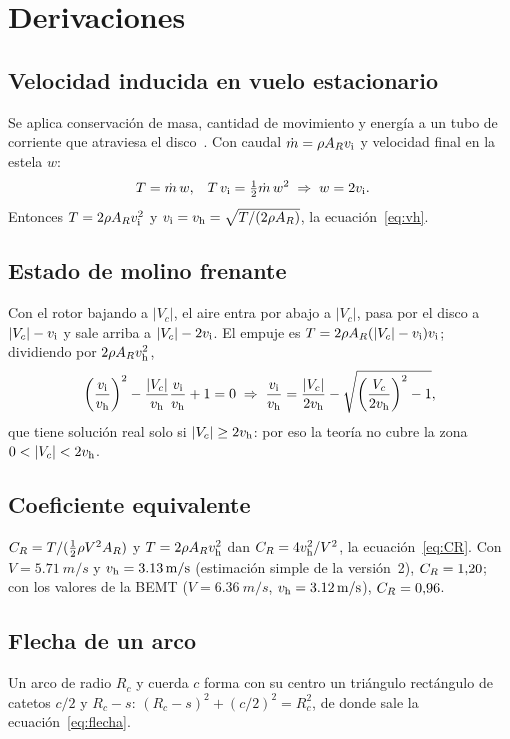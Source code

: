\chapter{Derivaciones}\label{ap:deriv}

\section{Velocidad inducida en vuelo estacionario}
Se aplica conservación de masa, cantidad de movimiento y energía a un tubo de corriente
que atraviesa el disco~\cite{leishman2006}. Con caudal $\dot m=\rho A_Rv_{\mathrm{i}}$ y velocidad
final en la estela $w$:
\begin{align*}
  T &= \dot m\,w, &
  T\,v_{\mathrm{i}} &= \tfrac12\dot m\,w^2
  \;\Rightarrow\; w=2v_{\mathrm{i}} .
\end{align*}
Entonces $T=2\rho A_Rv_{\mathrm{i}}^2$ y $v_{\mathrm{i}}=v_{\mathrm{h}}=\sqrt{T/(2\rho A_R)}$, la
ecuación~\eqref{eq:vh}.

\section{Estado de molino frenante}
Con el rotor bajando a $|V_c|$, el aire entra por abajo a $|V_c|$, pasa por el disco a
$|V_c|-v_{\mathrm{i}}$ y sale arriba a $|V_c|-2v_{\mathrm{i}}$. El empuje es
$T=2\rho A_R(|V_c|-v_{\mathrm{i}})v_{\mathrm{i}}$; dividiendo por $2\rho A_Rv_{\mathrm{h}}^2$,
\begin{equation*}
  \left(\frac{v_{\mathrm{i}}}{v_{\mathrm{h}}}\right)^2 - \frac{|V_c|}{v_{\mathrm{h}}}\frac{v_{\mathrm{i}}}{v_{\mathrm{h}}} + 1 = 0
  \;\Rightarrow\;
  \frac{v_{\mathrm{i}}}{v_{\mathrm{h}}} = \frac{|V_c|}{2v_{\mathrm{h}}} - \sqrt{\left(\frac{V_c}{2v_{\mathrm{h}}}\right)^2-1},
\end{equation*}
que tiene solución real solo si $|V_c|\ge2v_{\mathrm{h}}$: por eso la teoría no cubre la zona
$0<|V_c|<2\vh$.

\section{Coeficiente equivalente}
$C_{R}=T/(\tfrac12\rho V^2A_R)$ y $T=2\rho A_Rv_{\mathrm{h}}^2$ dan
$C_{R}=4v_{\mathrm{h}}^2/V^2$, la ecuación~\eqref{eq:CR}. Con $V=\SI{5.71}{m/s}$ y
$v_{\mathrm{h}}=\SI{3.13}{m/s}$ (estimación simple de la versión~2), $C_{R}=1{,}20$; con los valores de la BEMT
($V=\SI{6.36}{m/s}$, $v_{\mathrm{h}}=\SI{3.12}{m/s}$), $C_{R}=0{,}96$.

\section{Flecha de un arco}
Un arco de radio $R_c$ y cuerda $c$ forma con su centro un triángulo rectángulo de catetos
$c/2$ y $R_c-s$: $(R_c-s)^2+(c/2)^2=R_c^2$, de donde sale la ecuación~\eqref{eq:flecha}.

